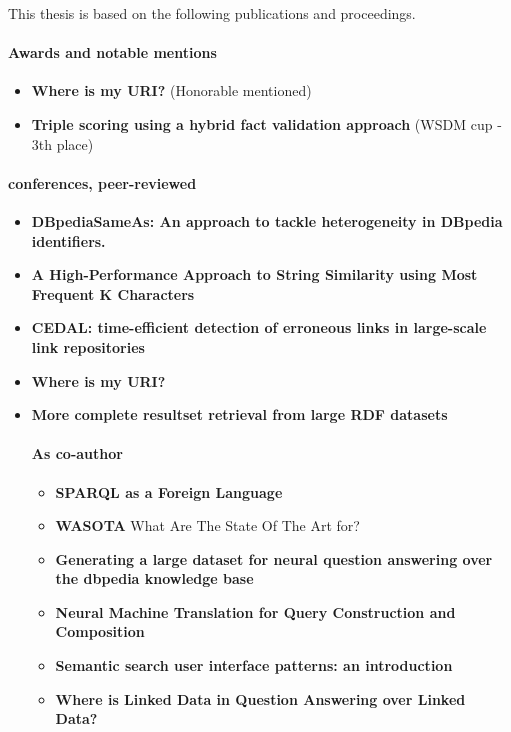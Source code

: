 This thesis is based on the following publications and proceedings.

\paragraph{Awards and notable mentions}

\begin{itemize}
    \item \textbf{Where is my URI?} (Honorable mentioned) \cite{valdestilhas2018my}
    \item \textbf{Triple scoring using a hybrid fact validation approach} (WSDM cup - 3th place) \cite{marx2017triple}
\end{itemize}

\paragraph{conferences, peer-reviewed}

\begin{itemize}
    \item \textbf{DBpediaSameAs: An approach to tackle heterogeneity in DBpedia identifiers.} \cite{valdestilhas2015dbpediasameas}
    \item \textbf{A High-Performance Approach to String Similarity using Most Frequent K Characters} \cite{valdestilhas2017high}
    \item \textbf{CEDAL: time-efficient detection of erroneous links in large-scale link repositories} \cite{valdestilhas2017cedal}
    \item \textbf{Where is my URI?} \cite{valdestilhas2018my}
    \item \textbf{More complete resultset retrieval from large RDF datasets} \cite{ValdestilhasKcap}
    \paragraph{As co-author}
    \begin{itemize}
        \item \textbf{SPARQL as a Foreign Language} \cite{soru2017sparql}
        \item \textbf{WASOTA} What Are The State Of The Art for? \cite{neto2016wasota}
        \item \textbf{Generating a large dataset for neural question answering over the dbpedia knowledge base}        \cite{hartmann2018generating}
        \item \textbf{Neural Machine Translation for Query Construction and Composition} \cite{soru2018neural}
        \item \textbf{Semantic search user interface patterns: an introduction} \cite{marx2017semantic}
        \item \textbf{Where is Linked Data in Question Answering over Linked Data?} \cite{soru2020linked}
    \end{itemize}
\end{itemize}

